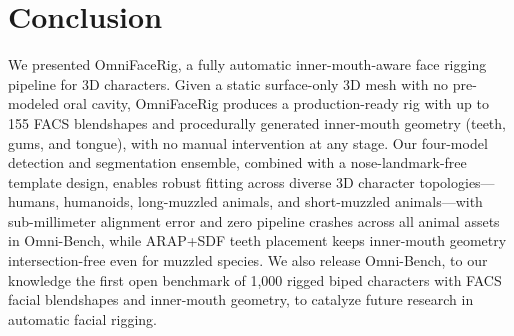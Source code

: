 \documentclass[acmtog,anonymous,review]{acmart}
\begin{document}
\section{Conclusion}
\label{sec:conclusion}

We presented OmniFaceRig, a fully automatic inner-mouth-aware face rigging pipeline for 3D characters. Given a static surface-only 3D mesh with no pre-modeled oral cavity, OmniFaceRig produces a production-ready rig with up to 155 FACS blendshapes and procedurally generated inner-mouth geometry (teeth, gums, and tongue), with no manual intervention at any stage. Our four-model detection and segmentation ensemble, combined with a nose-landmark-free template design, enables robust fitting across diverse 3D character topologies---humans, humanoids, long-muzzled animals, and short-muzzled animals---with sub-millimeter alignment error and zero pipeline crashes across all animal assets in Omni-Bench, while ARAP+SDF teeth placement keeps inner-mouth geometry intersection-free even for muzzled species. We also release Omni-Bench, to our knowledge the first open benchmark of 1,000 rigged biped characters with FACS facial blendshapes and inner-mouth geometry, to catalyze future research in automatic facial rigging.

\begin{acks}
\end{acks}



\end{document}

